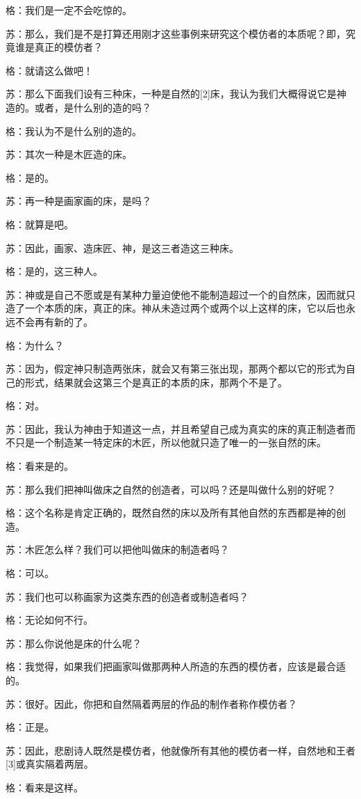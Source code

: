 \documentclass[12pt,oneside]{book}
\begin{document}
格：我们是一定不会吃惊的。

苏：那么，我们是不是打算还用刚才这些事例来研究这个模仿者的本质呢？即，究竟谁是真正的模仿者？

格：就请这么做吧！

苏：那么下面我们设有三种床，一种是自然的[2]床，我认为我们大概得说它是神造的。或者，是什么别的造的吗？

格：我认为不是什么别的造的。

苏：其次一种是木匠造的床。

格：是的。

苏：再一种是画家画的床，是吗？

格：就算是吧。

苏：因此，画家、造床匠、神，是这三者造这三种床。

格：是的，这三种人。

苏：神或是自己不愿或是有某种力量迫使他不能制造超过一个的自然床，因而就只造了一个本质的床，真正的床。神从未造过两个或两个以上这样的床，它以后也永远不会再有新的了。

格：为什么？

苏：因为，假定神只制造两张床，就会又有第三张出现，那两个都以它的形式为自己的形式，结果就会这第三个是真正的本质的床，那两个不是了。

格：对。

苏：因此，我认为神由于知道这一点，并且希望自己成为真实的床的真正制造者而不只是一个制造某一特定床的木匠，所以他就只造了唯一的一张自然的床。

格：看来是的。

苏：那么我们把神叫做床之自然的创造者，可以吗？还是叫做什么别的好呢？

格：这个名称是肯定正确的，既然自然的床以及所有其他自然的东西都是神的创造。

苏：木匠怎么样？我们可以把他叫做床的制造者吗？

格：可以。

苏：我们也可以称画家为这类东西的创造者或制造者吗？

格：无论如何不行。

苏：那么你说他是床的什么呢？

格：我觉得，如果我们把画家叫做那两种人所造的东西的模仿者，应该是最合适的。

苏：很好。因此，你把和自然隔着两层的作品的制作者称作模仿者？

格：正是。

苏：因此，悲剧诗人既然是模仿者，他就像所有其他的模仿者一样，自然地和王者[3]或真实隔着两层。

格：看来是这样。
\end{document}
